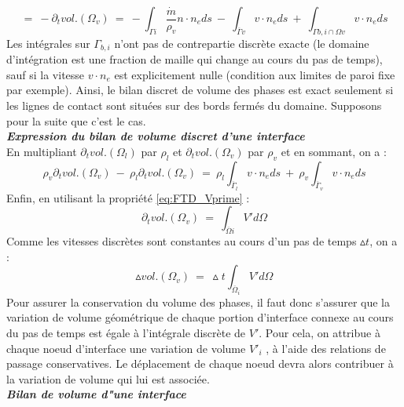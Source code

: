 \begin{equation}
=\:-\partial_{t}vol.(\Omega_{v})\:=\:-\int_{\Gamma i}\dfrac{\dot{m}}{\rho_{v}}n\cdot n_{e}ds\:-\:\int_{\overline{\Gamma}v}v \cdot n_{e} ds\:+\:\int_{\Gamma b,i \cap \Omega v} v \cdot n_{e} ds
\end{equation}
Les int\'egrales sur $\Gamma_{b,i}$ n'ont pas de contrepartie discrète exacte (le domaine d'int\'egration est une fraction de maille qui change au cours du pas de temps), sauf si la vitesse $v \cdot n_{e}$ est explicitement nulle (condition aux limites de paroi fixe par exemple). Ainsi, le bilan discret de volume des phases est exact seulement si les lignes de contact sont situ\'ees sur des bords ferm\'es du domaine. Supposons pour la suite que c'est le cas.
\smallskip \\

\textit{\textbf{Expression du bilan de volume discret d'une interface}}
\smallskip \\
En multipliant $\partial_{t}vol.(\Omega_{l})$ par $\rho_{l}$ et $\partial_{t}vol.(\Omega_{v})$ par $\rho_{v}$ et en sommant, on a :
\begin{equation}
\rho_{v}\partial_{t}vol.(\Omega_{v})\:-\:\rho_{l}\partial_{t}vol.(\Omega_{v})\:=\:\rho_{l}\int_{\overline{\Gamma}_{l}} v \cdot n_{e} ds\:+\:\rho_{v}\int_{\overline{\Gamma}_{v}} v \cdot n_{e} ds
\end{equation}
Enfin, en utilisant la propri\'et\'e \ref{eq:FTD_Vprime} :
\begin{equation}
\partial_{t}vol.(\Omega_{v})\:=\:\int_{\overline{\Omega} i} V' d\Omega
\end{equation}
Comme les vitesses discrètes sont constantes au cours d'un pas de temps $\vartriangle t$, on a :
\begin{equation}
\vartriangle vol.(\Omega_{v})\:=\:\vartriangle t \int_{\overline{\Omega}_{i}} V' d\Omega
\end{equation}
Pour assurer la conservation du volume des phases, il faut donc s'assurer que la variation de volume g\'eom\'etrique de chaque portion d'interface connexe au cours du pas de temps est \'egale \`a l'int\'egrale discr\`ete de $V'$.
Pour cela, on attribue \`a chaque noeud d'interface une variation de volume $V'_{i}$ , \`a l'aide des relations de passage conservatives. Le d\'eplacement de chaque noeud devra alors contribuer \`a la variation de volume qui lui est associ\'ee.
\smallskip \\

\textit{\textbf{Bilan de volume d"une interface}}
\smallskip \\


